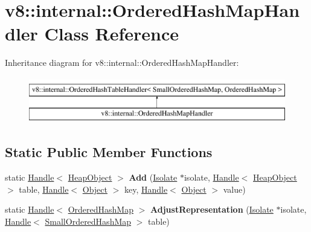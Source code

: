 \hypertarget{classv8_1_1internal_1_1OrderedHashMapHandler}{}\section{v8\+:\+:internal\+:\+:Ordered\+Hash\+Map\+Handler Class Reference}
\label{classv8_1_1internal_1_1OrderedHashMapHandler}
Inheritance diagram for v8\+:\+:internal\+:\+:Ordered\+Hash\+Map\+Handler\+:\begin{figure}[H]
\begin{center}
\leavevmode
\includegraphics[height=2.000000cm]{classv8_1_1internal_1_1OrderedHashMapHandler}
\end{center}
\end{figure}
\subsection*{Static Public Member Functions}
\begin{DoxyCompactItemize}
\item 
\mbox{\label{classv8_1_1internal_1_1OrderedHashMapHandler_adf6296f5d4ff66bf4b4a6ea0983720af}} 
static \mbox{\hyperlink{classv8_1_1internal_1_1Handle}{Handle}}$<$ \mbox{\hyperlink{classv8_1_1internal_1_1HeapObject}{Heap\+Object}} $>$ {\bfseries Add} (\mbox{\hyperlink{classv8_1_1internal_1_1Isolate}{Isolate}} $\ast$isolate, \mbox{\hyperlink{classv8_1_1internal_1_1Handle}{Handle}}$<$ \mbox{\hyperlink{classv8_1_1internal_1_1HeapObject}{Heap\+Object}} $>$ table, \mbox{\hyperlink{classv8_1_1internal_1_1Handle}{Handle}}$<$ \mbox{\hyperlink{classv8_1_1internal_1_1Object}{Object}} $>$ key, \mbox{\hyperlink{classv8_1_1internal_1_1Handle}{Handle}}$<$ \mbox{\hyperlink{classv8_1_1internal_1_1Object}{Object}} $>$ value)
\item 
\mbox{\label{classv8_1_1internal_1_1OrderedHashMapHandler_ac01cb44f8a7d68251eaf94df95633fd5}} 
static \mbox{\hyperlink{classv8_1_1internal_1_1Handle}{Handle}}$<$ \mbox{\hyperlink{classv8_1_1internal_1_1OrderedHashMap}{Ordered\+Hash\+Map}} $>$ {\bfseries Adjust\+Representation} (\mbox{\hyperlink{classv8_1_1internal_1_1Isolate}{Isolate}} $\ast$isolate, \mbox{\hyperlink{classv8_1_1internal_1_1Handle}{Handle}}$<$ \mbox{\hyperlink{classv8_1_1internal_1_1SmallOrderedHashMap}{Small\+Ordered\+Hash\+Map}} $>$ table)
\end{DoxyCompactItemize}
